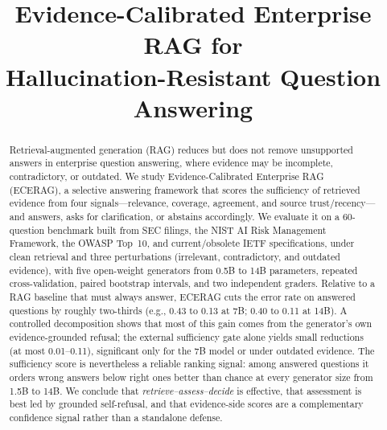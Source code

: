\documentclass[conference,letterpaper]{IEEEtran}
\begin{document}
\title{Evidence-Calibrated Enterprise RAG for\\Hallucination-Resistant Question Answering}

\author{
\and
{}
}

\maketitle

\begin{abstract}
Retrieval-augmented generation (RAG) reduces but does not remove unsupported answers in
enterprise question answering, where evidence may be incomplete, contradictory, or outdated.
We study Evidence-Calibrated Enterprise RAG (ECERAG), a selective answering framework that scores
the sufficiency of retrieved evidence from four signals---relevance, coverage, agreement, and
source trust/recency---and answers, asks for clarification, or abstains accordingly. We evaluate it
on a 60-question benchmark built from SEC filings, the NIST AI Risk Management Framework, the
OWASP Top~10, and current/obsolete IETF specifications, under clean retrieval and three
perturbations (irrelevant, contradictory, and outdated evidence), with five open-weight generators
from 0.5B to 14B parameters, repeated cross-validation, paired bootstrap intervals, and two
independent graders. Relative to a RAG baseline that must always answer, ECERAG cuts the error
rate on answered questions by roughly two-thirds (e.g., 0.43 to 0.13 at 7B; 0.40 to 0.11 at 14B).
A controlled decomposition shows that most of this gain comes from the generator's own
evidence-grounded refusal; the external sufficiency gate alone yields small reductions (at most
0.01--0.11), significant only for the 7B model or under outdated evidence. The sufficiency score is
nevertheless a reliable ranking signal: among answered questions it orders wrong answers below
right ones better than chance at every generator size from 1.5B to 14B. We conclude that
\emph{retrieve--assess--decide} is effective, that assessment is best led by grounded
self-refusal, and that evidence-side scores are a complementary confidence signal rather than a
standalone defense.
\end{abstract}
\end{document}
